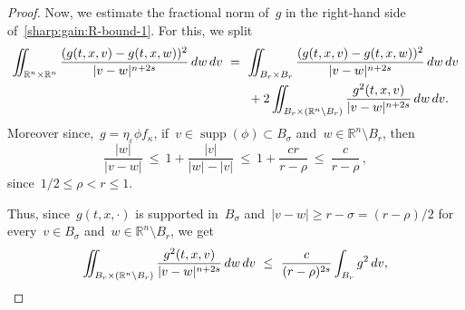 \documentclass[leqno,10pt]{amsart}
\theoremstyle{plain}
\theoremstyle{remark}
\numberwithin{equation}{section}
\def\dv{\,{\rm d}v}
\def\dw{\,{\rm d}w}
\def\ern{\mathbb{R}^n}
\newcommand{\kk}{\kappa}
\newcommand{\eps}{\varepsilon}
\begin{document}
{\begin{proof}
    Now, we estimate the fractional norm of~$g$ in the right-hand side of~\eqref{sharp:gain:R-bound-1}. For this, we split 
    \[
    \begin{aligned}
            \iint_{\ern\times\ern}\frac{(g(t,x,v)-g(t,x,w))^2}{|v-w|^{n+2s}}\dw\dv & \ = \   \iint_{B_r \times B_r}\frac{(g(t,x,v)-g(t,x,w))^2}{|v-w|^{n+2s}}\dw\dv \\
            & \qquad + 2   \iint_{B_r \times (\ern\setminus B_r)}\frac{g^2(t,x,v)}{|v-w|^{n+2s}}\dw\dv .
    \end{aligned}
    \]
    Moreover since,~$g=\eta_\eps \phi f_\kk$, if~$v\in\operatorname{supp}(\phi)\subset B_{\sigma}$ and~$w \in \ern\setminus B_r$, then
    \begin{equation}\label{eq:kernel-est}
     \frac{|w|}{|v-w|} \ \leq \ 1 + \frac{|v|}{|w|-|v|} \ \leq \ 1+\frac{c r}{r-\rho}  \ \leq \ \frac{c}{r-\rho}\,,
    \end{equation}
   since~$1/2 \leq \rho < r \leq 1$.  


 Thus, since~$g(t,x,\cdot)$ is supported in~$B_\sigma$ and~$|v-w| \geq r-\sigma = (r-\rho)/2$ for every~$v \in B_\sigma$ and~$w \in \ern\setminus B_r$, we get
   $$
    \iint_{B_r \times (\ern\setminus B_r)}\frac{g^2(t,x,v)}{|v-w|^{n+2s}}\dw\dv  \ \leq \ \frac{c}{(r-\rho)^{2s}}\int_{B_r}g^2\dv,
   $$
  

\end{proof}}
\end{document}
